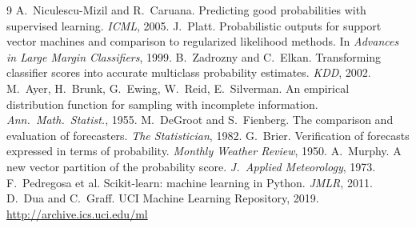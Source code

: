 \documentclass[11pt,a4paper]{article}
\begin{document}
\begin{thebibliography}{9}\small
{} A.~Niculescu-Mizil and R.~Caruana. Predicting good probabilities with supervised learning. \emph{ICML}, 2005.
 J.~Platt. Probabilistic outputs for support vector machines and comparison to regularized likelihood methods. In \emph{Advances in Large Margin Classifiers}, 1999.
 B.~Zadrozny and C.~Elkan. Transforming classifier scores into accurate multiclass probability estimates. \emph{KDD}, 2002.
 M.~Ayer, H.~Brunk, G.~Ewing, W.~Reid, E.~Silverman. An empirical distribution function for sampling with incomplete information. \emph{Ann.\ Math.\ Statist.}, 1955.
 M.~DeGroot and S.~Fienberg. The comparison and evaluation of forecasters. \emph{The Statistician}, 1982.
 G.~Brier. Verification of forecasts expressed in terms of probability. \emph{Monthly Weather Review}, 1950.
 A.~Murphy. A new vector partition of the probability score. \emph{J.\ Applied Meteorology}, 1973.
 F.~Pedregosa et al. Scikit-learn: machine learning in Python. \emph{JMLR}, 2011.
 D.~Dua and C.~Graff. UCI Machine Learning Repository, 2019. \url{http://archive.ics.uci.edu/ml}
\end{thebibliography}
\end{document}
